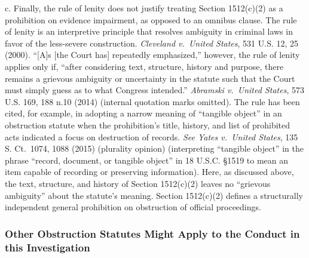 c. Finally, the rule of lenity does not justify treating Section 1512(c)(2) as a prohibition on evidence impairment, as opposed to an omnibus clause.
The rule of lenity is an interpretive principle that resolves ambiguity in criminal laws in favor of the less-severe construction.
\textit{Cleveland v.\ United States}, 531 U.S. 12, 25 (2000).
“[A]s [the Court has] repeatedly emphasized,” however, the rule of lenity applies only if, “after considering text, structure, history and purpose, there remains a grievous ambiguity or uncertainty in the statute such that the Court must simply guess as to what Congress intended.”
\textit{Abramski v.\ United States}, 573 U.S. 169, 188 n.10 (2014) (internal quotation marks omitted).
The rule has been cited, for example, in adopting a narrow meaning of “tangible object” in an obstruction statute when the prohibition’s title, history, and list of prohibited acts indicated a focus on destruction of records.
\textit{See Yates v.\ United States}, 135 S. Ct.~1074, 1088 (2015) (plurality opinion) (interpreting “tangible object” in the phrase “record, document, or tangible object” in 18 U.S.C. \S 1519 to mean an item capable of recording or preserving information).
Here, as discussed above, the text, structure, and history of Section 1512(c)(2) leaves no “grievous ambiguity” about the statute’s meaning.
Section 1512(c)(2) defines a structurally independent general prohibition on obstruction of official proceedings.

\subsubsection{Other Obstruction Statutes Might Apply to the Conduct in this Investigation}

